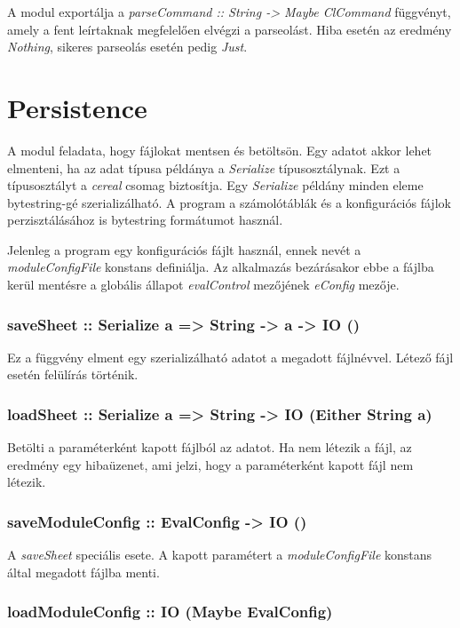 A modul exportálja a \textit{parseCommand :: String -> Maybe ClCommand} függvényt, amely a fent leírtaknak megfelelően elvégzi a parseolást. Hiba esetén az eredmény \textit{Nothing}, sikeres parseolás esetén pedig \textit{Just}.

\section{Persistence}

A modul feladata, hogy fájlokat mentsen és betöltsön. Egy adatot akkor lehet elmenteni, ha az adat típusa példánya a \textit{Serialize} típusosztálynak. Ezt a típusosztályt a \textit{cereal} csomag biztosítja. Egy \textit{Serialize} példány minden eleme bytestring-gé szerializálható. A program a számolótáblák és a konfigurációs fájlok perzisztálásához is bytestring formátumot használ.

Jelenleg a program egy konfigurációs fájlt használ, ennek nevét a \textit{moduleConfigFile} konstans definiálja. Az alkalmazás bezárásakor ebbe a fájlba kerül mentésre a globális állapot \textit{evalControl} mezőjének \textit{eConfig} mezője.

\subsubsection{saveSheet :: Serialize a => String -> a -> IO ()}

Ez a függvény elment egy szerializálható adatot a megadott fájlnévvel. Létező fájl esetén felülírás történik. 

\subsubsection{loadSheet :: Serialize a => String -> IO (Either String a)}

Betölti a paraméterként kapott fájlból az adatot. Ha nem létezik a fájl, az eredmény egy hibaüzenet, ami jelzi, hogy a paraméterként kapott fájl nem létezik.

\subsubsection{saveModuleConfig :: EvalConfig -> IO ()}

A \textit{saveSheet} speciális esete. A kapott paramétert a \textit{moduleConfigFile} konstans által megadott fájlba menti.

\subsubsection{loadModuleConfig :: IO (Maybe EvalConfig)}

